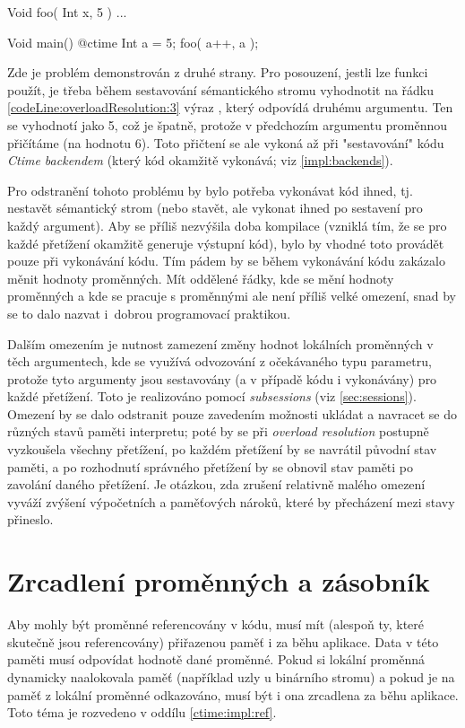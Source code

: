 \begin{code}
Void foo( Int x, 5 ) { ... }

Void main() {
	@ctime {
		Int a = 5;
		foo( a++, a );$\label{codeLine:overloadResolution:3}$
	}
}
\end{code}

Zde je problém demonstrován z druhé strany. Pro posouzení, jestli lze funkci  použít, je třeba během sestavování sémantického stromu vyhodnotit na řádku \ref{codeLine:overloadResolution:3} výraz , který odpovídá druhému argumentu. Ten se vyhodnotí jako 5, což je špatně, protože v předchozím argumentu proměnnou  přičítáme (na hodnotu 6). Toto přičtení se ale vykoná až při "sestavování" kódu \textit{Ctime backendem} (který kód okamžitě vykonává; viz \autoref{impl:backends}).

Pro odstranění tohoto problému by bylo potřeba vykonávat kód ihned, tj. nestavět sémantický strom (nebo stavět, ale vykonat ihned po sestavení pro každý argument). Aby se příliš nezvýšila doba kompilace (vzniklá tím, že se pro každé přetížení okamžitě generuje výstupní kód), bylo by vhodné toto provádět pouze při vykonávání \ctime kódu. Tím pádem by se během vykonávání \nonctime kódu zakázalo měnit hodnoty \ctime proměnných. Mít oddělené řádky, kde se mění hodnoty \ctime proměnných a kde se pracuje s \nonctime proměnnými ale není příliš velké omezení, snad by se to dalo nazvat i~dobrou programovací praktikou.

Dalším omezením je nutnost zamezení změny hodnot lokálních proměnných v těch argumentech, kde se využívá odvozování z očekávaného typu parametru, protože tyto argumenty jsou sestavovány (a v případě \ctime kódu i vykonávány) pro každé přetížení. Toto je realizováno pomocí \textit{subsessions} (viz \ref{sec:sessions}). Omezení by se dalo odstranit pouze zavedením možnosti ukládat a navracet se do různých stavů paměti interpretu; poté by se při \textit{overload resolution} postupně vyzkoušela všechny přetížení, po každém přetížení by se navrátil původní stav paměti, a po rozhodnutí správného přetížení by se obnovil stav paměti po zavolání daného přetížení. Je otázkou, zda zrušení relativně malého omezení vyváží zvýšení výpočetních a paměťových nároků, které by přecházení mezi stavy přineslo.

\section{Zrcadlení \ctime proměnných a \ctime zásobník} \label{impl:ctimemirror}
Aby mohly být \ctime proměnné referencovány v \nonctime kódu, musí mít (alespoň ty, které skutečně jsou referencovány) přiřazenou paměť i za běhu aplikace. Data v této paměti musí odpovídat hodnotě dané \ctime proměnné. Pokud si lokální \ctime proměnná dynamicky naalokovala paměť (například uzly u binárního stromu) a pokud je na paměť z lokální proměnné odkazováno, musí být i ona zrcadlena za běhu aplikace. Toto téma je rozvedeno v oddílu \ref{ctime:impl:ref}.

